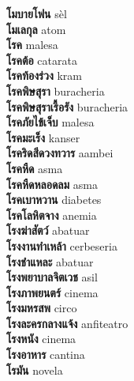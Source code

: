 \textbf{ โมบายโฟน  } sèl \\
\textbf{ โมเลกุล  } atom \\
\textbf{ โรค  } malesa \\
\textbf{ โรคต้อ  } catarata \\
\textbf{ โรคท้องร่วง  } kram \\
\textbf{ โรคพิษสุรา  } buracheria \\
\textbf{ โรคพิษสุราเรื้อรัง  } buracheria \\
\textbf{ โรคภัยไข้เจ็บ  } malesa \\
\textbf{ โรคมะเร็ง  } kanser \\
\textbf{ โรคริดสีดวงทวาร  } aambei \\
\textbf{ โรคหืด  } asma \\
\textbf{ โรคหืดหลอดลม  } asma \\
\textbf{ โรคเบาหวาน  } diabetes \\
\textbf{ โรคโลหิตจาง  } anemia \\
\textbf{ โรงฆ่าสัตว์  } abatuar \\
\textbf{ โรงงานทำเหล้า  } cerbeseria \\
\textbf{ โรงชำแหละ  } abatuar \\
\textbf{ โรงพยาบาลจิตเวช  } asil \\
\textbf{ โรงภาพยนตร์  } cinema \\
\textbf{ โรงมหรสพ  } circo \\
\textbf{ โรงละครกลางแจ้ง  } anfiteatro \\
\textbf{ โรงหนัง  } cinema \\
\textbf{ โรงอาหาร  } cantina \\
\textbf{ โรมัน  } novela \\
